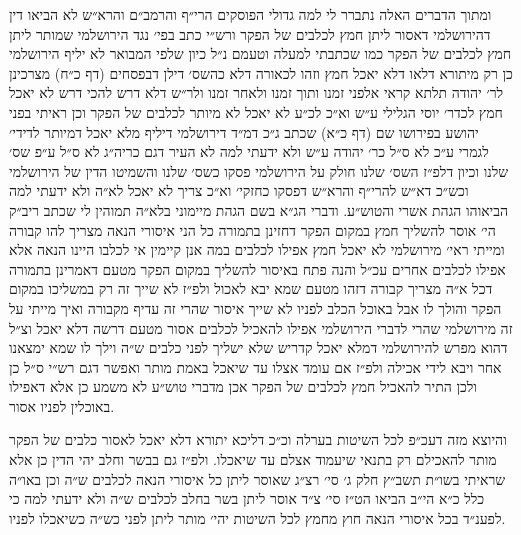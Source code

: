 \documentclass[12pt, openany]{book}
\begin{document}
\begin{multicols}{2}
ומתוך הדברים האלה נתברר לי למה גדולי הפוסקים הרי״ף והרמב״ם והרא״ש לא הביאו דין דהירושלמי דאסור ליתן חמץ לכלבים של הפקר ורש״י כתב בפי׳ נגד הירושלמי שמותר ליתן חמץ לכלבים של הפקר כמו שכתבתי למעלה וטעמם נ״ל כיון שלפי המבואר לא יליף הירושלמי כן רק מיתורא דלאו דלא יאכל חמץ וזהו לכאורה דלא כהשס׳ דילן דבפסחים (דף כ״ח) מצרכינן לר׳ יהודה תלתא קראי אלפני זמנו ותוך זמנו ולאחר זמנו ולר״ש דלא דרש להכי דרש לא יאכל חמץ לכדר׳ יוסי הגלילי ע״ש וא״כ לכ״ע לא יאכל לא מיותר לכלבים של הפקר וכן ראיתי בפני יהושע בפירושו שם (דף כ״א) שכתב ג״כ דמ״ד דירושלמי דיליף מלא יאכל דמיותר לדידי׳ לגמרי ע״כ לא ס״ל כר׳ יהודה ע״ש ולא ידעתי למה לא העיר דגם כריה״ג לא ס״ל ע״פ שס׳ שלנו וכיון דלפ״ז השס׳ שלנו חולק על הירושלמי פסקו כשס׳ שלנו והשמיטו הדין של הירושלמי וכש״כ דא״ש להרי״ף והרא״ש דפסקו כחזקי׳ וא״כ צריך לא יאכל לא״ה ולא ידעתי למה הביאוהו הגהת אשרי והטוש״ע. ודברי הג״א בשם הגהת מיימוני בלא״ה תמוהין לי שכתב ריב״ק הי׳ אוסר להשליך חמץ במקום הפקר דחזינן בתמורה כל הני איסורי הנאה מצריך להו קבורה ומייתי ראי׳ מירושלמי לא יאכל חמץ אפילו לכלבים במה אנן קיימין אי לכלבו היינו הנאה אלא אפילו לכלבים אחרים עכ״ל והנה פתח באיסור להשליך במקום הפקר מטעם דאמרינן בתמורה דכל א״ה מצריך קבורה דזהו מטעם שמא יבא לאכול ולפ״ז לא שייך זה רק במשליכו במקום הפקר והולך לו אבל באוכל הכלב לפניו לא שייך איסור שהרי זה עדיף מקבורה ואיך מייתי על זה מירושלמי שהרי לדברי הירושלמי אפילו להאכיל לכלבים אסור מטעם דרשה דלא יאכל וצ״ל דהוא מפרש להירושלמי דמלא יאכל קדריש שלא ישליך לפני כלבים ש״ה וילך לו שמא ימצאנו אחר ויבא לידי אכילה ולפ״ז אם עומד אצלו עד שיאכל באמת מותר ואפשר דגם רש״י ס״ל כן ולכן התיר להאכיל חמץ לכלבים של הפקר אכן מדברי טוש״ע לא משמע כן אלא דאפילו באוכלין לפניו אסור.\\\vspace{0pt}

והיוצא מזה דעכ״פ לכל השיטות בערלה וכ״כ דליכא יתורא דלא יאכל לאסור כלבים של הפקר מותר להאכילם רק בתנאי שיעמוד אצלם עד שיאכלו. ולפ״ז גם בבשר וחלב יהי הדין כן אלא שראיתי בשו״ת תשב״ץ חלק ג׳ סי׳ רצ״ג שאוסר ליתן כל איסורי הנאה לכלבים ש״ה וכן באו״ה כלל כ״א הי״ב הביאו הט״ז סי׳ צ״ד אוסר ליתן בשר בחלב לכלבים ש״ה ולא ידעתי למה כי לפענ״ד בכל איסורי הנאה חוץ מחמץ לכל השיטות יהי׳ מותר ליתן לפני כש״ה כשיאכלו לפניו.\\\vspace{0pt}


\end{multicols}
\end{document}
